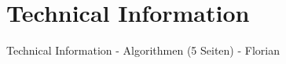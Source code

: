 \section{Technical Information}\label{sec:techinfo}
Technical Information - Algorithmen (5 Seiten) - Florian
